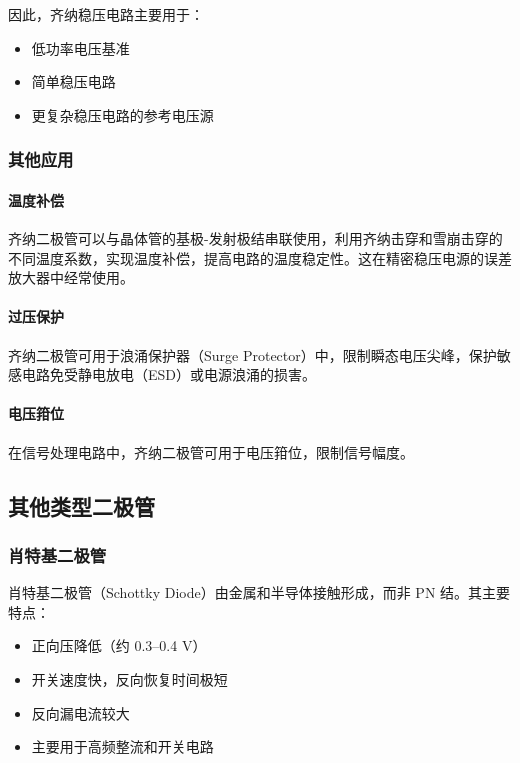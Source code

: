因此，齐纳稳压电路主要用于：
\begin{itemize}
  \item 低功率电压基准
  \item 简单稳压电路
  \item 更复杂稳压电路的参考电压源
\end{itemize}

\subsubsection{其他应用}

\paragraph{温度补偿}

齐纳二极管可以与晶体管的基极-发射极结串联使用，利用齐纳击穿和雪崩击穿的不同温度系数，实现温度补偿，提高电路的温度稳定性。这在精密稳压电源的误差放大器中经常使用。

\paragraph{过压保护}

齐纳二极管可用于浪涌保护器（Surge Protector）中，限制瞬态电压尖峰，保护敏感电路免受静电放电（ESD）或电源浪涌的损害。

\paragraph{电压箝位}

在信号处理电路中，齐纳二极管可用于电压箝位，限制信号幅度。

\subsection{其他类型二极管}

\subsubsection{肖特基二极管}

肖特基二极管（Schottky Diode）由金属和半导体接触形成，而非 PN 结。其主要特点：

\begin{itemize}
  \item 正向压降低（约 0.3--0.4 V）
  \item 开关速度快，反向恢复时间极短
  \item 反向漏电流较大
  \item 主要用于高频整流和开关电路
\end{itemize}

